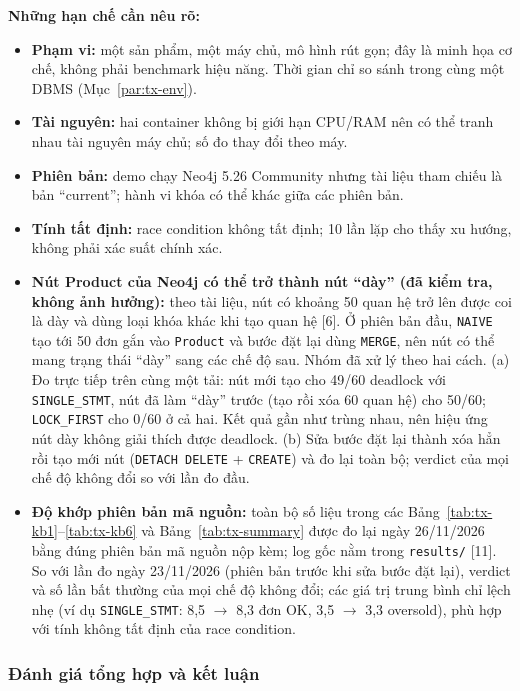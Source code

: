 \textbf{Những hạn chế cần nêu rõ:}
\begin{itemize}
    \item \textbf{Phạm vi:} một sản phẩm, một máy chủ, mô hình rút gọn; đây là minh họa cơ chế, không phải benchmark hiệu năng. Thời gian chỉ so sánh trong cùng một DBMS (Mục~\ref{par:tx-env}).
    \item \textbf{Tài nguyên:} hai container không bị giới hạn CPU/RAM nên có thể tranh nhau tài nguyên máy chủ; số đo thay đổi theo máy.
    \item \textbf{Phiên bản:} demo chạy Neo4j 5.26 Community nhưng tài liệu tham chiếu là bản ``current''; hành vi khóa có thể khác giữa các phiên bản.
    \item \textbf{Tính tất định:} race condition không tất định; 10 lần lặp cho thấy xu hướng, không phải xác suất chính xác.
    \item \textbf{Nút Product của Neo4j có thể trở thành nút ``dày'' (đã kiểm tra, không ảnh hưởng):} theo tài liệu, nút có khoảng 50 quan hệ trở lên được coi là dày và dùng loại khóa khác khi tạo quan hệ [6]. Ở phiên bản đầu, \texttt{NAIVE} tạo tới 50 đơn gắn vào \texttt{Product} và bước đặt lại dùng \texttt{MERGE}, nên nút có thể mang trạng thái ``dày'' sang các chế độ sau. Nhóm đã xử lý theo hai cách. (a) Đo trực tiếp trên cùng một tải: nút mới tạo cho 49/60 deadlock với \texttt{SINGLE\_STMT}, nút đã làm ``dày'' trước (tạo rồi xóa 60 quan hệ) cho 50/60; \texttt{LOCK\_FIRST} cho 0/60 ở cả hai. Kết quả gần như trùng nhau, nên hiệu ứng nút dày không giải thích được deadlock. (b) Sửa bước đặt lại thành xóa hẳn rồi tạo mới nút (\texttt{DETACH DELETE} + \texttt{CREATE}) và đo lại toàn bộ; verdict của mọi chế độ không đổi so với lần đo đầu.
    \item \textbf{Độ khớp phiên bản mã nguồn:} toàn bộ số liệu trong các Bảng~\ref{tab:tx-kb1}--\ref{tab:tx-kb6} và Bảng~\ref{tab:tx-summary} được đo lại ngày 26/11/2026 bằng đúng phiên bản mã nguồn nộp kèm; log gốc nằm trong \texttt{results/} [11]. So với lần đo ngày 23/11/2026 (phiên bản trước khi sửa bước đặt lại), verdict và số lần bất thường của mọi chế độ không đổi; các giá trị trung bình chỉ lệch nhẹ (ví dụ \texttt{SINGLE\_STMT}: 8,5 $\rightarrow$ 8,3 đơn OK, 3,5 $\rightarrow$ 3,3 oversold), phù hợp với tính không tất định của race condition.
\end{itemize}

\subsubsection{Đánh giá tổng hợp và kết luận}
\label{subsubsec:tx-conclusion}

